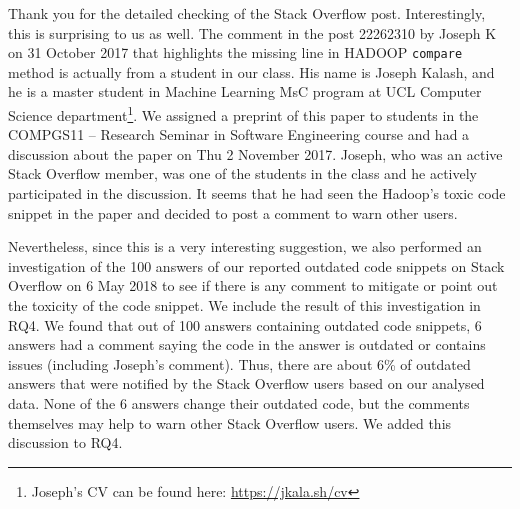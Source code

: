 \documentclass[a4paper,twoside,10pt]{reviewresponse}
\begin{document}

Thank you for the detailed checking of the Stack Overflow post. Interestingly,
this is surprising to us as well. The comment in the post 22262310 by Joseph K
on 31 October 2017 that highlights the missing line in HADOOP \texttt{compare}
method is actually from a student in our class. His name is Joseph Kalash, and he
is a master student in Machine Learning MsC program at UCL Computer Science
department\footnote{Joseph's CV can be found here: \url{https://jkala.sh/cv}}.
We assigned a preprint of this paper to students in the COMPGS11 -- Research
Seminar in Software Engineering course and had a discussion about the paper on
Thu 2 November 2017. Joseph, who was an active Stack Overflow member, was one of
the students in the class and he actively participated in the discussion. It
seems that he had seen the Hadoop's toxic code snippet in the paper and decided
to post a comment to warn other users.

Nevertheless, since this is a very interesting suggestion, we also performed an
investigation of the 100 answers of our reported outdated code snippets on Stack
Overflow on 6 May 2018 to see if there is any comment to mitigate or point out
the toxicity of the code snippet. We include the result of this investigation in
RQ4. We found that out of 100 answers containing outdated code snippets,
6 answers had a comment saying the code in the answer is
outdated or contains issues (including Joseph's comment). Thus, there are about
6\% of outdated answers that were notified by the Stack Overflow users based on
our analysed data. None of the 6 answers change their outdated code, but the
comments themselves may help to warn other Stack Overflow users. We added this
discussion to RQ4.

\end{document}
